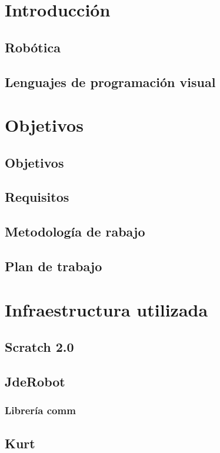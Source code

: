 \documentclass{article}
\begin{document}
 
\tableofcontents
 
\vspace{2cm}
 
\section{Introducción}
    \subsection{Robótica}
    \subsection{Lenguajes de programación visual}
\section{Objetivos}
    \subsection{Objetivos}
    \subsection{Requisitos}
    \subsection{Metodología de rabajo}
    \subsection{Plan de trabajo}
\section{Infraestructura utilizada}
    \subsection{Scratch 2.0}
    \subsection{JdeRobot}
    \subsubsection{Librería comm}
    \subsection{Kurt}
\end{document}
